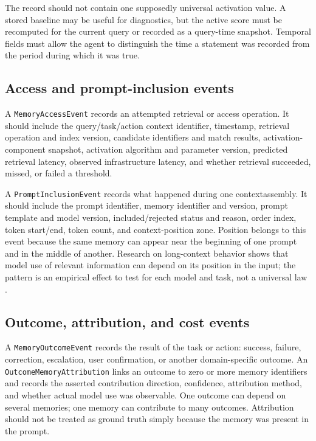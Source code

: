 The record should not contain one supposedly universal activation value. A stored baseline may be useful for diagnostics, but the active score must be recomputed for the current query or recorded as a query-time snapshot. Temporal fields must allow the agent to distinguish the time a statement was recorded from the period during which it was true.

\subsection{Access and prompt-inclusion events}
\label{subsec:ch12-access-inclusion}

A \texttt{MemoryAccessEvent} records an attempted retrieval or access operation. It should include the query/task/action context identifier, timestamp, retrieval operation and index version, candidate identifiers and match results, activation-component snapshot, activation algorithm and parameter version, predicted retrieval latency, observed infrastructure latency, and whether retrieval succeeded, missed, or failed a threshold.

A \texttt{PromptInclusionEvent} records what happened during one \gls{contextassembly}. It should include the prompt identifier, memory identifier and version, prompt template and model version, included/rejected status and reason, order index, token start/end, token count, and context-position zone. Position belongs to this event because the same memory can appear near the beginning of one prompt and in the middle of another. Research on long-context behavior shows that model use of relevant information can depend on its position in the input; the pattern is an empirical effect to test for each model and task, not a universal law \autocite{liu2024lostmiddle}.

\subsection{Outcome, attribution, and cost events}
\label{subsec:ch12-outcome-events}

A \texttt{MemoryOutcomeEvent} records the result of the task or action: success, failure, correction, escalation, user confirmation, or another domain-specific outcome. An \texttt{OutcomeMemoryAttribution} links an outcome to zero or more memory identifiers and records the asserted contribution direction, confidence, attribution method, and whether actual model use was observable. One outcome can depend on several memories; one memory can contribute to many outcomes. Attribution should not be treated as ground truth simply because the memory was present in the prompt.

